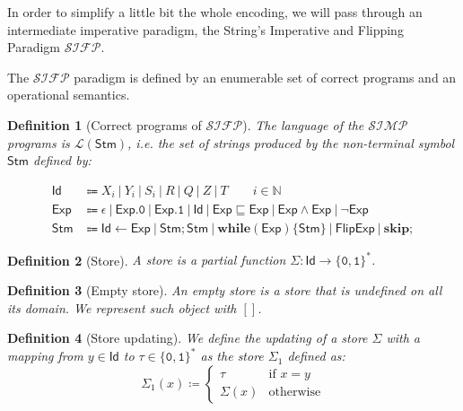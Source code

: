 \documentclass[10pt]{amsart}
\newcommand{\SIMP}{\mathcal{SIMP}}
\newcommand{\SIFP}{\mathcal{SIFP}}
\newcommand{\zero}{\mathtt{0}}
\newcommand{\one}{\mathtt{1}}
\newcommand{\NN}{\mathbb{N}}
\newcommand{\lang}[1]{\mathcal L(#1)}
\newcommand{\id}{\mathsf{Id}}
\newcommand{\stm}{\mathsf{Stm}}
\newcommand{\xp}{\mathsf{Exp}}
\newcommand{\fl}{\mathsf{Flip}}
\newcommand{\while}[2]{\mathbf{while}(#1)\{#2\}}
\newcommand{\sk}{\mathbf{skip};}
\newcommand{\takes}{\leftarrow}
\newcommand{\store}{\Sigma}
\newtheorem{defn}{Definition}
\begin{document}
In order to simplify a little bit the whole encoding, we will pass through an intermediate imperative paradigm, the String's Imperative and Flipping Paradigm $\SIFP$.

The $\SIFP$ paradigm is defined by an enumerable set of correct programs and an operational semantics.


\begin{defn}[Correct programs of $\SIFP$]
The language of the $\SIMP$ programs is $\lang{\stm}$, i.e. the set of strings produced by the non-terminal symbol $\stm$ defined by:

\begin{align*}
\id &\Coloneqq X_i\ |\ Y_i\ |\ S_i\ |\ R\ |\ Q\ |\ Z\ |\ T\qquad i \in \NN\\
\xp &\Coloneqq \epsilon\ |\ \xp.\zero\ |\ \xp.\one\ |\ \id\ |\ \xp \sqsubseteq \xp\ |\ \xp \land \xp\ |\ \lnot \xp\\
\stm & \Coloneqq \id \takes \xp\ |\ \stm;\stm\ |\ \while \xp \stm\ |\ \fl \xp\ |\ \sk
\end{align*}
\end{defn}

\begin{defn}[Store]
A store is a partial function $\store: \id \longrightarrow \{\zero, \one\}^*$.
\end{defn}

\begin{defn}[Empty store]
An \emph{empty} store is a store that is undefined on all its domain. We represent such object with $[]$.
\end{defn}

\begin{defn}[Store updating]
We define the updating of a store $\store$ with a mapping from $y \in \id$ to $\tau \in \{\zero, \one\}^*$ as the store $\store_1$ defined as:
\[
\store_1(x) \coloneqq \begin{cases} \tau & \text{if } x = y\\ \store(x) & \text{otherwise}\end{cases}
\]
\end{defn}
\end{document}
